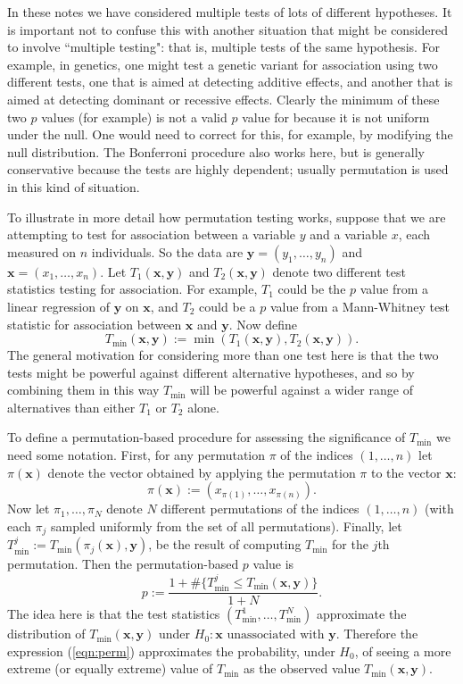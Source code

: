 \documentclass[times,11pt]{article}
\begin{document}
\def\x{\mathbf x}
\def\y{\mathbf y}
\def\Tmin{T_\text{min}}

In these notes we have considered multiple tests of lots of different hypotheses. It is important not to confuse this with another situation that might be considered to involve ``multiple testing": that is,
multiple tests of the same hypothesis. For example, 
in genetics, one might test a genetic variant for association using two different tests, one that is
aimed at detecting additive effects, and another that is aimed at detecting dominant or recessive effects.
Clearly the minimum of these two $p$ values (for example) is not a valid $p$ value for because it is not uniform under the null. One would need to correct for this, for example, by modifying the null distribution. The Bonferroni procedure also works here, but is generally conservative because the tests are highly dependent; usually permutation is used in this kind of situation. 

To illustrate in more detail how permutation testing works, 
suppose that we are attempting to test for association between a variable $y$ and a variable $x$, each measured on $n$ individuals.
So the data are $\y=(y_1,\dots,y_n)$ and $\x=(x_1,\dots,x_n)$. Let $T_1(\x,\y)$ and $T_2(\x,\y)$ denote two different test statistics testing for association. For example,
$T_1$ could be the $p$ value from a linear regression of $\y$ on $\x$, and $T_2$ could be a $p$ value from a Mann-Whitney test statistic for association between $\x$ and $\y$. Now define 
\begin{equation}
\Tmin(\x,\y):= \min(T_1(\x,\y),T_2(\x,\y)).
\end{equation}
The general motivation for considering more than one test here is that the two tests might be powerful against different alternative hypotheses, and 
so by combining them in this way $\Tmin$ will be powerful against a wider range of alternatives than either $T_1$ or $T_2$ alone.

To define a permutation-based procedure for assessing the significance of $\Tmin$ we need some notation.
First, for any permutation $\pi$ of the indices $(1,\dots,n)$ let $\pi(\x)$ denote the vector obtained by applying the permutation $\pi$ to the vector $\x$:  
\begin{equation}
\pi(\x):=(x_{\pi(1)},\dots,x_{\pi(n)}).
\end{equation}
Now let $\pi_1,\dots,\pi_N$ denote $N$ different permutations of the indices $(1,\dots,n)$ (with each $\pi_j$ sampled uniformly from the set of all permutations).
Finally, let $\Tmin^j:= \Tmin(\pi_j(\x),\y)$, be the result of computing $\Tmin$ for the $j$th permutation.
Then the permutation-based $p$ value is
\begin{equation} \label{eqn:permp}
p:= \frac{1+\#\{\Tmin^j \leq \Tmin(\x,\y)\}}{1+N}.
\end{equation}
The idea here is that the test statistics $(\Tmin^1,\dots,\Tmin^N)$ approximate the distribution of $\Tmin(\x,\y)$ under $H_0: \text{$\x$ unassociated with $\y$}$. Therefore
the expression  (\ref{eqn:perm}) approximates the probability, under $H_0$, of seeing a more extreme (or equally extreme) value of $\Tmin$ as the observed value $\Tmin(\x,\y)$.


\end{document}
